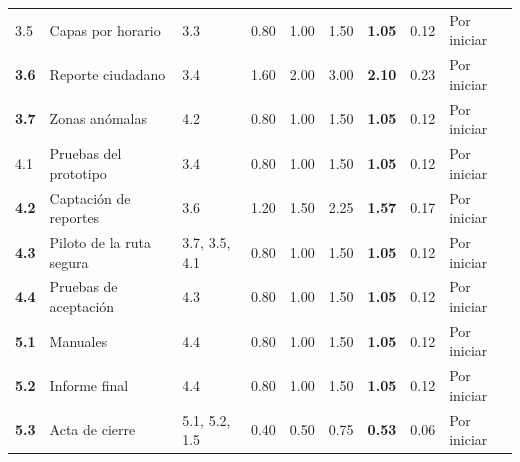 \documentclass[11pt,a4paper]{article}
\begin{document}
{\begin{longtable}{@{}P{0.75cm} >{\raggedright\arraybackslash}p{4.3cm} P{1.95cm} Q{0.85cm} Q{0.85cm} Q{0.85cm} Q{0.95cm} Q{0.85cm} C{1.75cm}@{}}
3.5 & Capas por horario & 3.3 & 0.80 & 1.00 & 1.50 & \textbf{1.05} & 0.12 & Por iniciar \\
\textbf{3.6} & Reporte ciudadano & 3.4 & 1.60 & 2.00 & 3.00 & \textbf{2.10} & 0.23 & Por iniciar \\
\textbf{3.7} & Zonas anómalas & 4.2 & 0.80 & 1.00 & 1.50 & \textbf{1.05} & 0.12 & Por iniciar \\
4.1 & Pruebas del prototipo & 3.4 & 0.80 & 1.00 & 1.50 & \textbf{1.05} & 0.12 & Por iniciar \\
\textbf{4.2} & Captación de reportes & 3.6 & 1.20 & 1.50 & 2.25 & \textbf{1.57} & 0.17 & Por iniciar \\
\textbf{4.3} & Piloto de la ruta segura & 3.7, 3.5, 4.1 & 0.80 & 1.00 & 1.50 & \textbf{1.05} & 0.12 & Por iniciar \\
\textbf{4.4} & Pruebas de aceptación & 4.3 & 0.80 & 1.00 & 1.50 & \textbf{1.05} & 0.12 & Por iniciar \\
\textbf{5.1} & Manuales & 4.4 & 0.80 & 1.00 & 1.50 & \textbf{1.05} & 0.12 & Por iniciar \\
\textbf{5.2} & Informe final & 4.4 & 0.80 & 1.00 & 1.50 & \textbf{1.05} & 0.12 & Por iniciar \\
\textbf{5.3} & Acta de cierre & 5.1, 5.2, 1.5 & 0.40 & 0.50 & 0.75 & \textbf{0.53} & 0.06 & Por iniciar \\
\end{longtable}
}

\end{document}

